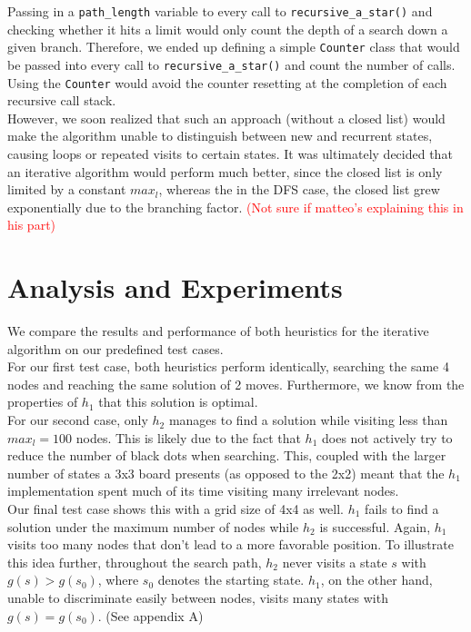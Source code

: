 \documentclass[runningheads]{llncs}
\newcommand{\code}[1]{\texttt{#1}}
\begin{document}
Passing in a \code{path\_length} variable to every call to \code{recursive\_a\_star()} and checking whether it hits a limit would only count the depth of a search down a given branch. Therefore, we ended up defining a simple \code{Counter} class that would be passed into every call to \code{recursive\_a\_star()} and count the number of calls. Using the \code{Counter} would avoid the counter resetting at the completion of each recursive call stack. \\

However, we soon realized that such an approach (without a closed list) would make the algorithm unable to distinguish between new and recurrent states, causing loops or repeated visits to certain states. It was ultimately decided that an iterative algorithm would perform much better, since the closed list is only limited by a constant $max_l$, whereas the in the DFS case, the closed list grew exponentially due to the branching factor. \textcolor{red}{(Not sure if matteo's explaining this in his part)}


\section{Analysis and Experiments}

We compare the results and performance of both heuristics for the iterative algorithm on our predefined test cases. \\

For our first test case, both heuristics perform identically, searching the same 4 nodes and reaching the same solution of 2 moves. Furthermore, we know from the properties of $h_1$ that this solution is optimal. \\

For our second case, only $h_2$ manages to find a solution while visiting less than $max_l=100$ nodes. This is likely due to the fact that $h_1$ does not actively try to reduce the number of black dots when searching. This, coupled with the larger number of states a 3x3 board presents (as opposed to the 2x2) meant that the $h_1$ implementation spent much of its time visiting many irrelevant nodes. \\

Our final test case shows this with a grid size of 4x4 as well. $h_1$ fails to find a solution under the maximum number of nodes while $h_2$ is successful. Again, $h_1$ visits too many nodes that don't lead to  a more favorable position. To illustrate this idea further, throughout the search path, $h_2$ never visits a state $s$ with $g(s) > g(s_0)$, where $s_0$ denotes the starting state. $h_1$, on the other hand, unable to discriminate easily between nodes, visits many states with $g(s) = g(s_0)$. (See appendix A)  \\
\end{document}
